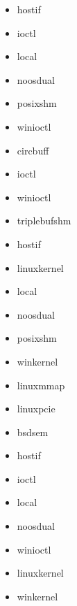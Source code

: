 \begin{description}[leftmargin=0cm]
    \item[error handler] \mbox{}
    \begin{multicols}{3}
        \begin{itemize}
            \item hostif
            \item ioctl
            \item local
            \item noosdual
            \item posixshm
            \item winioctl
        \end{itemize}
    \end{multicols}
    
    \item[DLL] \mbox{}
    \begin{multicols}{3}
        \begin{itemize}
            \item circbuff
            \item ioctl
            \item winioctl
        \end{itemize}
    \end{multicols}
    
    \item[PDO] \mbox{}
    \begin{multicols}{3}
        \begin{itemize}
            \item triplebufshm
            \item hostif
            \item linuxkernel
            \item local
            \item noosdual
            \item posixshm
            \item winkernel
            \item linuxmmap
            \item linuxpcie
        \end{itemize}
    \end{multicols}
    \newpage
    
    \item[time sync] \mbox{}
    \begin{multicols}{3}
        \begin{itemize}
            \item bsdsem
            \item hostif
            \item ioctl
            \item local
            \item noosdual
            \item winioctl
            \item linuxkernel
            \item winkernel
        \end{itemize}
    \end{multicols}
\end{description}

